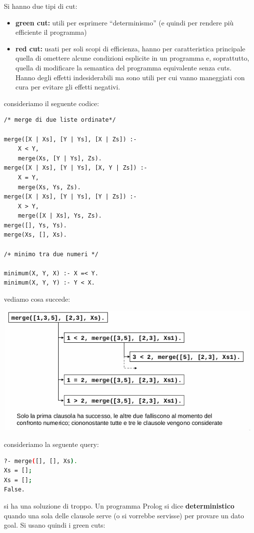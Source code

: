 \documentclass[a4paper]{report}
\begin{document}
Si hanno due tipi di cut:
\begin{itemize}
\item \textbf{green cut: } utili per esprimere “determinismo” (e quindi per rendere più efficiente il programma)
\item \textbf{red cut: } usati per soli scopi di efficienza, hanno per caratteristica principale quella di omettere
  alcune condizioni esplicite in un programma e, soprattutto, quella di modificare la semantica del programma equivalente senza cuts.
  Hanno degli effetti indesiderabili ma sono utili per cui vanno maneggiati con cura per evitare gli effetti negativi.
\end{itemize}
consideriamo il seguente codice:
\begin{verbatim}
/* merge di due liste ordinate*/

merge([X | Xs], [Y | Ys], [X | Zs]) :-
	X < Y,
	merge(Xs, [Y | Ys], Zs).
merge([X | Xs], [Y | Ys], [X, Y | Zs]) :-
	X = Y,
	merge(Xs, Ys, Zs).
merge([X | Xs], [Y | Ys], [Y | Zs]) :-
	X > Y,
	merge([X | Xs], Ys, Zs).
merge([], Ys, Ys).
merge(Xs, [], Xs).

/+ minimo tra due numeri */

minimum(X, Y, X) :- X =< Y.
minimum(X, Y, Y) :- Y < X.
\end{verbatim}
vediamo cosa succede:
\begin{center}
\includegraphics[scale=0.8]{img/cut2.png}
\end{center}
consideriamo la seguente query:
\begin{shaded}
\begin{lstlisting}[language=bash]
?- merge([], [], Xs).
Xs = [];
Xs = [];
False.
\end{lstlisting}
\end{shaded}
si ha una soluzione di troppo.
Un programma Prolog si dice \textbf{deterministico} quando una sola delle clausole serve (o si vorrebbe servisse) per provare un dato goal. Si usano quindi i green cuts:
\end{document}
